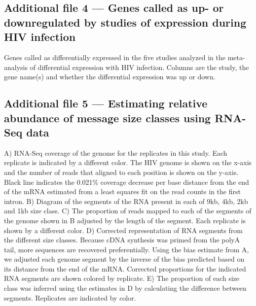 \documentclass[../sherrill-Mix_thesis.tex]{subfiles}
\begin{document}
  \subsection{Additional file 4 --- Genes called as up- or downregulated by studies of expression during HIV infection}
    Genes called as differentially expressed in the five studies analyzed in the meta-analysis of differential expression with HIV infection. Columns are the study, the gene name(s) and whether the differential expression was up or down.

  \subsection{Additional file 5 --- Estimating relative abundance of \hivEight{} message size classes using RNA-Seq data}
		A) RNA-Seq coverage of the \hivEight{} genome for the replicates in this study. Each replicate is indicated by a different color. The HIV genome is shown on the x-axis and the number of reads that aligned to each position is shown on the y-axis. Black line indicates the 0.021\% coverage decrease per base distance from the \threePrime{} end of the mRNA estimated from a least squares fit on the read counts in the first intron.
		B) Diagram of the segments of the \hivEight{} RNA present in each of 9kb, 4kb, 2kb and 1kb size class. 
		C) The proportion of reads mapped to each of the segments of the \hivEight{} genome shown in B adjusted by the length of the segment. Each replicate is shown by a different color.
		D) Corrected representation of RNA segments from the different size classes. Because cDNA synthesis was primed from the polyA tail, more \threePrime{} sequences are recovered preferentially. Using the bias estimate from A, we adjusted each genome segment by the inverse of the bias predicted based on its distance from the \threePrime{} end of the mRNA. Corrected proportions for the indicated RNA segments are shown colored by replicate. 
		E) The proportion of each size class was inferred using the estimates in D by calculating the difference between segments. Replicates are indicated by color.
		
\end{document}

